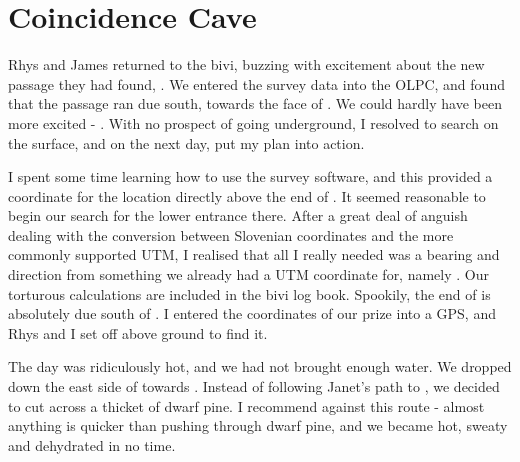 \section{Coincidence Cave}


    Rhys and James returned to the bivi, buzzing with excitement about the new passage they had found, . We entered the survey data into the OLPC, and found that the passage ran due south, towards the face of . We could hardly have been more excited - . With no prospect of going underground, I resolved to search on the surface, and on the next day, put my plan into action.

    I spent some time learning how to use the survey software, and this provided a coordinate for the location directly above the end of . It seemed reasonable to begin our search for the lower entrance there. After a great deal of anguish dealing with the conversion between Slovenian coordinates and the more commonly supported UTM, I realised that all I really needed was a bearing and direction from something we already had a UTM coordinate for, namely . Our torturous calculations are included in the bivi log book. Spookily, the end of  is absolutely due south of . I entered the coordinates of our prize into a GPS, and Rhys and I set off above ground to find it.

    The day was ridiculously hot, and we had not brought enough water. We dropped down the east side of  towards . Instead of following Janet's path to , we decided to cut across a thicket of dwarf pine. I recommend against this route - almost anything is quicker than pushing through dwarf pine, and we became hot, sweaty and dehydrated in no time.

